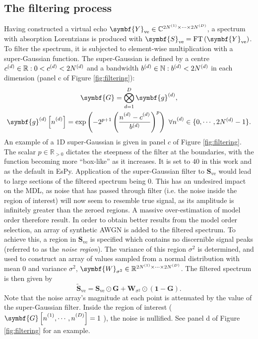\subsection{The filtering process}
Having constructed a virtual echo $\symbf{Y}_{\text{ve}} \in \mathbb{C}^{2\None
\times \cdots \times 2\ND}$, a spectrum with absorption Lorentzians is produced
with $\symbf{S}_{\text{ve}} = \FT\left(\symbf{Y}_{\text{ve}}\right)$. To filter
the spectrum, it is subjected to element-wise multiplication with a
super-Gaussian function. The super-Gaussian is defined by a centre
$c^{(d)} \in \mathbb{R}: 0 < c^{(d)} < 2 N^{(d)}$ and a bandwidth  $b^{(d)} \in
\mathbb{N}: b^{(d)} < 2N^{(d)}$ in each dimension (panel c of Figure
\ref{fig:filtering}):
\begin{subequations}
    \begin{gather}
        \symbf{G} = \bigotimes_{d=1}^D
            \symbf{g}^{(d)}, \\
        \symbf{g}_{\vphantom{t}}^{(d)}\left[ \nd \right] = \exp \left(
            -2^{p+1} \left(
                \frac{\nd - c^{(d)}_{\vphantom{t}}}{b^{(d)}}
            \right)^p
        \right)\ \forall \nd \in \lbrace 0, \cdots, 2 \Nd - 1 \rbrace.
        \label{eq:super-Gaussian-onedim}
    \end{gather}
\end{subequations}
An example of a \ac{1D} super-Gaussian is given in panel $c$ of Figure
\ref{fig:filtering}. The scalar $p \in \mathbb{R}_{>0}$ dictates the steepness
of the filter at the boundaries, with the function becoming more ``box-like''
as it increases. It is set to $40$ in this work and as the default in
\ac{EsPy}. Application of the super-Gaussian filter to $\symbf{S}_{\text{ve}}$
would lead to large sections of the filtered spectrum being $0$. This has an
undesired impact on the \ac{MDL}, as noise that has passed through filter (i.e.
the noise inside the region of interest) will now seem to resemble true signal,
as its amplitude is infinitely greater than the zeroed regions. A massive
over-estimation of model order therefore result. In order to obtain better
results from the model order selection, an array of synthetic \ac{AWGN} is
added to the filtered spectrum. To achieve this, a region in
$\symbf{S}_{\text{ve}}$ is specified which contains no discernible signal peaks
(referred to as the \emph{noise region}). The variance of this region
$\sigma^2$ is determined, and used to construct an array of values sampled from
a normal distribution with mean $0$ and variance $\sigma^2$,
$\symbf{W}_{\sigma^2} \in \mathbb{R}^{2 \None \times \cdots \times 2 \ND}$.
The filtered spectrum is then given by
\begin{equation}
    \widetilde{\symbf{S}}_{\text{ve}} = \symbf{S}_{\text{ve}} \odot \symbf{G} + \symbf{W}_{\sigma^2} \odot \left(\symbf{1} - \symbf{G} \right).
    \label{eq:Sve-tilde}
\end{equation}
Note that the noise array's magnitude at each point is attenuated by the value
of the super-Gaussian filter. Inside the region of interest ($\symbf{G}\left[
\none, \cdots, \nD \right] = 1$ ), the noise is nullified. See panel d of
Figure \ref{fig:filtering} for an example.

